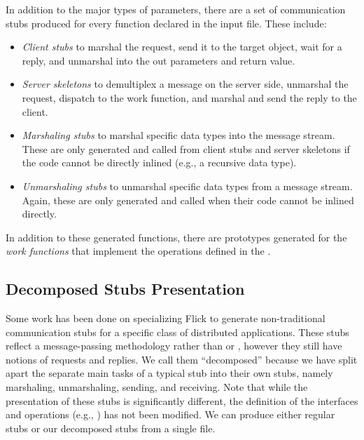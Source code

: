 In addition to the major types of parameters, there are a set of communication
stubs produced for every function declared in the input \IDL{} file.  These
include:

\begin{itemize}
  \item \emph{Client stubs} to marshal the request, send it to the target
  object, wait for a reply, and unmarshal into the out parameters and return
  value.

  \item \emph{Server skeletons} to demultiplex a message on the server side,
  unmarshal the request, dispatch to the work function, and marshal and send
  the reply to the client.

  \item \emph{Marshaling stubs} to marshal specific data types into the message
  stream.  These are only generated and called from client stubs and server
  skeletons if the code cannot be directly inlined (e.g., a recursive data
  type).

  \item \emph{Unmarshaling stubs} to unmarshal specific data types from a
  message stream.  Again, these are only generated and called when their code
  cannot be inlined directly.
\end{itemize}

In addition to these generated functions, there are prototypes generated for
the \emph{work functions} that implement the operations defined in the
\IDL{}\@.

\subsection{Decomposed Stubs Presentation}
\label{subsec:PG:Decomposed Stubs Presentation}

Some work has been done on specializing Flick to generate non-traditional
communication stubs for a specific class of distributed applications.  These
stubs reflect a message-passing methodology rather than \RPC{} or \RMI{},
however they still have notions of requests and replies.  We call them
``decomposed'' because we have split apart the separate main tasks of a typical
\RPC{} stub into their own stubs, namely marshaling, unmarshaling, sending, and
receiving.  Note that while the presentation of these stubs is significantly
different, the definition of the interfaces and operations (e.g., \CORBA{}
\IDL{}) has not been modified.  We can produce either regular \RPC{} stubs or
our decomposed stubs from a single  file.

